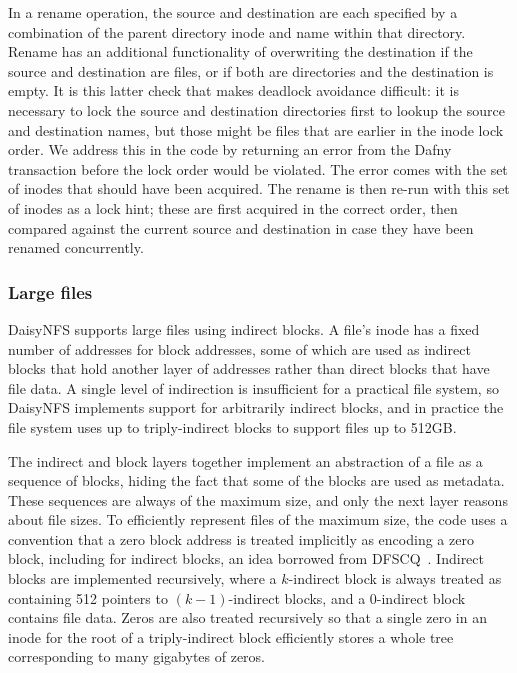 In a rename operation, the source and destination are each specified by a
combination of the parent directory inode and name within that directory. Rename
has an additional functionality of overwriting the destination if the source and
destination are files, or if both are directories and the destination is empty.
It is this latter check that makes deadlock avoidance difficult: it is necessary
to lock the source and destination directories first to lookup the source and
destination names, but those might be files that are earlier in the inode lock
order. We address this in the code by returning an error from the Dafny
transaction before the lock order would be violated. The error comes with the
set of inodes that should have been acquired.  The rename is then re-run with
this set of inodes as a lock hint; these are first acquired in the correct
order, then compared against the current source and destination in case they
have been renamed concurrently.

\subsubsection{Large files}%
\label{sec:dafny:indirect}

DaisyNFS supports large files using indirect blocks. A file's inode has a fixed
number of addresses for block addresses, some of which are used as indirect
blocks that hold another layer of addresses rather than direct blocks that have
file data. A single level of indirection is insufficient for a practical file
system, so DaisyNFS implements support for arbitrarily indirect blocks, and in
practice the file system uses up to triply-indirect blocks to support files up
to 512GB.\@

The indirect and block layers together implement an abstraction of a file as a
sequence of blocks, hiding the fact that some of the blocks are used as
metadata. These sequences are always of the maximum size, and only the next
layer reasons about file sizes. To efficiently represent files of the maximum
size, the code uses a convention that a zero block address is treated implicitly
as encoding a zero block, including for indirect blocks, an idea borrowed from
DFSCQ~\cite{akonradi-meng}. Indirect blocks are implemented recursively, where a
$k$-indirect block is always treated as containing 512 pointers to
$(k-1)$-indirect blocks, and a 0-indirect block contains file data. Zeros are
also treated recursively so that a single zero in an inode for the root of a
triply-indirect block efficiently stores a whole tree corresponding to many
gigabytes of zeros.

